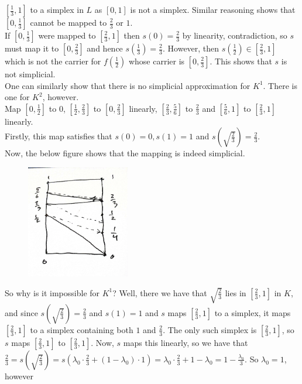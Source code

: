 \documentclass[a4paper]{article}
\begin{document}
$\left[ \frac{1}{3},1 \right] $ to a simplex in $L$ as $\left[ 0,1 \right] $ is
not a simplex. Similar reasoning shows that 
$\left[ 0,\frac{1}{3} \right] $ cannot be mapped to $\frac{2}{3}$ or $1$.\\
If $\left[ 0,\frac{1}{3} \right] $ were mapped to
$\left[ \frac{2}{3},1 \right] $ then $s(0) = \frac{2}{3}$ by linearity,
contradiction, so $s$ must map it to
$\left[ 0, \frac{2}{3} \right] $ and hence
$s(\frac{1}{3}) = \frac{2}{3}$. However, then
$s(\frac{1}{2}) \in \left[ \frac{2}{3},1 \right] $ which is not the carrier for
$f(\frac{1}{2})$ whose carrier is 
$\left[ 0, \frac{2}{3} \right] $. This shows that $s$ is not simplicial.\\
\linebreak
One can similarly show that there is no simplicial approximation for
$K^{1}$. There is one for $K^{2}$, however.\\
Map $\left[ 0,\frac{1}{2} \right] $ to $0$,
$\left[ \frac{1}{2},\frac{2}{3} \right] $ to $\left[ 0, \frac{2}{3} \right]
$ linearly, $\left[ \frac{2}{3},\frac{5}{6} \right] $ to
$\frac{2}{3}$ and $\left[ \frac{5}{6},1 \right] $ to
$\left[ \frac{2}{3},1 \right] $ linearly.\\
\linebreak
Firstly, this map satisfies that
$s(0) = 0, s(1)=1$ and $s\left( \sqrt{\frac{2}{3}}  \right) 
= \frac{2}{3}$.\\
Now, the below figure shows that the mapping is indeed simplicial.
\begin{figure}[H]
    \centering
    \includegraphics[width=0.4\textwidth]{ex6.8.jpeg}
    \label{fig:ex6-8-jpeg}
\end{figure}
So why is it impossible for $K^{1}$? Well, there we have that
$\sqrt{\frac{2}{3}} $ lies in
$\left[ \frac{2}{3},1 \right] $ in $K$, 
and since $s \left( \sqrt{\frac{2}{3}}  \right) = \frac{2}{3}$ and
$s (1) = 1$ and $s$ maps $\left[ \frac{2}{3},1 \right] $ to a simplex, it maps
$\left[ \frac{2}{3},1 \right] $ to a simplex containing both $1$ and
$\frac{2}{3}$. The only such simplex is $\left[ \frac{2}{3},1 \right] $, so
$s$ maps $\left[ \frac{2}{3},1 \right] $ to
$\left[ \frac{2}{3},1 \right] $. Now, $s$ maps this linearly, so we have that
$\frac{2}{3} = s\left( \sqrt{\frac{2}{3}}  \right) 
= s\left( \lambda_0 \cdot \frac{2}{3} + (1- \lambda_0) \cdot 1 \right) 
= \lambda_0 \cdot \frac{2}{3} + 1 - \lambda_0
= 1 - \frac{\lambda_0}{3}$. So $\lambda_0 = 1$, however
 
\end{document}
